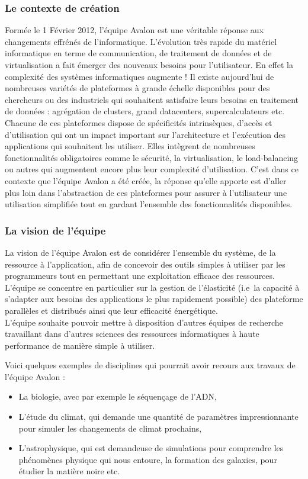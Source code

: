 \subsubsection{Le contexte de création}
Formée le 1 Février 2012, l'équipe Avalon est une véritable réponse aux changements effrénés de l'informatique.
L'évolution très rapide du matériel informatique en terme de communication, de traitement de données et de virtualisation a fait émerger des nouveaux besoins pour l'utilisateur. En effet la complexité des systèmes informatiques augmente !
Il existe aujourd'hui de nombreuses variétés de plateformes à grande échelle disponibles pour des chercheurs ou des industriels qui souhaitent satisfaire leurs besoins en traitement de données : agrégation de \glspl{cluster}, grand \glspl{datacenter}, supercalculateurs etc.
Chacune de ces plateformes dispose de spécificités intrinsèques, d'accès et d'utilisation qui ont un impact important sur l'architecture et l'exécution des applications qui souhaitent les utiliser.
Elles intègrent de nombreuses fonctionnalités obligatoires comme le sécurité, la virtualisation, le \gls{load-balancing} ou autres qui augmentent encore plus leur complexité d'utilisation.
C'est dans ce contexte que l'équipe Avalon a été créée, la réponse qu'elle apporte est d'aller plus loin dans l'abstraction de ces plateformes pour assurer à l'utilisateur une utilisation simplifiée tout en gardant l'ensemble des fonctionnalités disponibles. \cite{avalonAR2012}

\subsubsection{La vision de l'équipe}
La vision de l'équipe Avalon est de considérer l'ensemble du système, de la ressource à l'application, afin de concevoir des outils simples à utiliser par les programmeurs tout en permettant une exploitation efficace des ressources.
L'équipe se concentre en particulier sur la gestion de l'élasticité (i.e\ la capacité à s'adapter aux besoins des applications le plus rapidement possible) des plateforme parallèles et distribués ainsi que leur efficacité énergétique. \cite{avalonAR2012}\\

L'équipe souhaite pouvoir mettre à disposition d'autres équipes de recherche travaillant dans d'autres sciences des ressources informatiques à haute performance de manière simple à utiliser.

Voici quelques exemples de disciplines qui pourrait avoir recours aux travaux de l'équipe Avalon :
\begin{itemize}
	\item La biologie, avec par exemple le séquençage de l'ADN,
	\item L'étude du climat, qui demande une quantité de paramètres impressionnante pour simuler les changements de climat prochains,
	\item L'astrophysique, qui est demandeuse de simulations pour comprendre les phénomènes physique qui nous entoure, la formation des galaxies, pour étudier la matière noire etc.
\end{itemize}